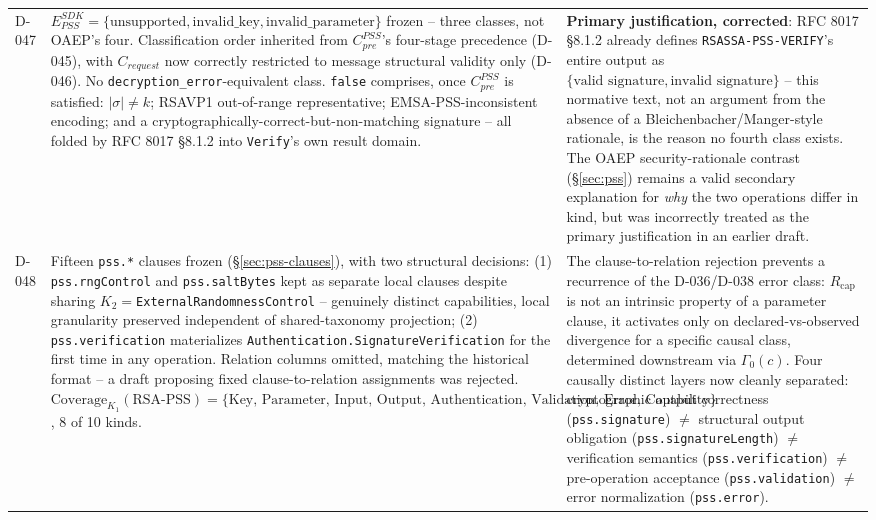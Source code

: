 \documentclass[11pt,a4paper]{article}
\begin{document}
\begin{longtable}{@{}L{0.28\textwidth}L{0.34\textwidth}L{0.30\textwidth}@{}}
D-047 & $E_{PSS}^{SDK} = \{\text{unsupported}, \text{invalid\_key}, \text{invalid\_parameter}\}$ frozen -- three classes, not OAEP's four. Classification order inherited from $C_{pre}^{PSS}$'s four-stage precedence (D-045), with $C_{request}$ now correctly restricted to message structural validity only (D-046). No \texttt{decryption\_error}-equivalent class. \texttt{false} comprises, once $C_{pre}^{PSS}$ is satisfied: $|\sigma|\neq k$; RSAVP1 out-of-range representative; EMSA-PSS-inconsistent encoding; and a cryptographically-correct-but-non-matching signature -- all folded by RFC 8017 \S8.1.2 into \texttt{Verify}'s own result domain. & \textbf{Primary justification, corrected}: RFC 8017 \S8.1.2 already defines \texttt{RSASSA-PSS-VERIFY}'s entire output as $\{\text{valid signature}, \text{invalid signature}\}$ -- this normative text, not an argument from the absence of a Bleichenbacher/Manger-style rationale, is the reason no fourth class exists. The OAEP security-rationale contrast (\S\ref{sec:pss}) remains a valid secondary explanation for \emph{why} the two operations differ in kind, but was incorrectly treated as the primary justification in an earlier draft.\\
D-048 & Fifteen \texttt{pss.*} clauses frozen (\S\ref{sec:pss-clauses}), with two structural decisions: (1) \texttt{pss.rngControl} and \texttt{pss.saltBytes} kept as separate local clauses despite sharing $K_2=$\texttt{ExternalRandomnessControl} -- genuinely distinct capabilities, local granularity preserved independent of shared-taxonomy projection; (2) \texttt{pss.verification} materializes \texttt{Authentication.SignatureVerification} for the first time in any operation. Relation columns omitted, matching the historical format -- a draft proposing fixed clause-to-relation assignments was rejected. $\text{Coverage}_{K_1}(\text{RSA-PSS}) = \{\text{Key, Parameter, Input, Output, Authentication, Validation, Error, Capability}\}$, 8 of 10 kinds. & The clause-to-relation rejection prevents a recurrence of the D-036/D-038 error class: $R_{\text{cap}}$ is not an intrinsic property of a parameter clause, it activates only on declared-vs-observed divergence for a specific causal class, determined downstream via $\Gamma_0(c)$. Four causally distinct layers now cleanly separated: cryptographic output correctness (\texttt{pss.signature}) $\neq$ structural output obligation (\texttt{pss.signatureLength}) $\neq$ verification semantics (\texttt{pss.verification}) $\neq$ pre-operation acceptance (\texttt{pss.validation}) $\neq$ error normalization (\texttt{pss.error}).\\

\end{longtable}
\end{document}
